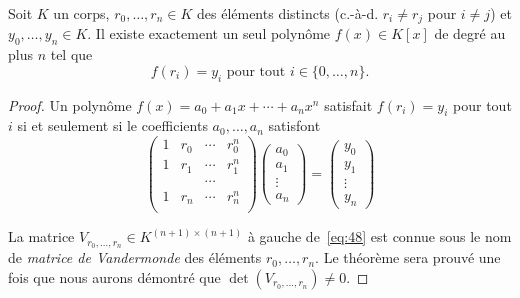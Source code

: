 \begin{theorem}
  \label{thr:52}
  Soit $K$ un corps, $r_0,\dots,r_n ∈K$ des éléments distincts (c.-à-d. $r_i ≠ r_j$ pour $i≠j$) et $y_0,\dots,y_n ∈K$. Il existe  exactement un seul polynôme $f(x) ∈ K[x]$ de degré au plus $n$ tel que
  \begin{displaymath}
    f(r_i) = y_i \text{ pour tout } i ∈ \{0,\dots,n\}. 
  \end{displaymath}
\end{theorem}

\begin{proof}
  Un polynôme  $f(x) = a_0 + a_1x + \cdots + a_n x^n$ satisfait $f(r_i) = y_i$ pour tout $i$ si et seulement si le coefficients $a_0,\dots,a_n$ satisfont
  \begin{equation}
    \label{eq:48}
    \begin{pmatrix}
      1 & r_0& \cdots & r_0^n \\
      1 & r_1& \cdots & r_1^n \\
       & &  \cdots  &  \\
       1 & r_n& \cdots & r_n^n \\
     \end{pmatrix}
     \begin{pmatrix}
       a_0\\ a_1 \\ \vdots \\ a_n
     \end{pmatrix} =
     \begin{pmatrix}
       y_0\\ y_1 \\ \vdots \\ y_n
     \end{pmatrix}
   \end{equation}

   La matrice $V_{r_0,\dots,r_n} ∈K^{(n+1)×(n+1)}$  à gauche de~\eqref{eq:48} est connue sous le nom de \emph{matrice de Vandermonde}
   des éléments $r_0,\dots,r_n$. Le théorème sera prouvé une fois que nous aurons démontré que $\det(V_{r_0,\dots,r_n}) ≠0$.


\end{proof}
